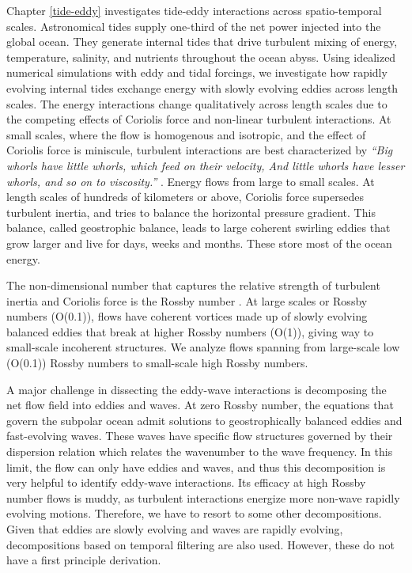 \documentclass[../Rajarshi-thesis-draft.tex]{subfiles}
\begin{document}

Chapter \ref{tide-eddy} investigates tide-eddy interactions across spatio-temporal scales. Astronomical tides supply one-third of the net power injected into the global ocean. They generate internal tides that drive turbulent mixing of energy, temperature, salinity, and nutrients throughout the ocean abyss. Using idealized numerical simulations with eddy and tidal forcings, we investigate how rapidly evolving internal tides exchange energy with slowly evolving eddies across length scales. The energy interactions change qualitatively across length scales due to the competing effects of Coriolis force and non-linear turbulent interactions. At small scales, where the flow is homogenous and isotropic, and the effect of Coriolis force is miniscule, turbulent interactions are best characterized by \emph{``Big whorls have little whorls, which feed on their velocity, And little whorls have lesser whorls, and so on to viscosity.''} \cite{richardson2007}. Energy flows from large to small scales. At length scales of hundreds of kilometers or above, Coriolis force supersedes turbulent inertia, and tries to balance the horizontal pressure gradient. This balance, called geostrophic balance, leads to large coherent swirling eddies that grow larger and live for days, weeks and months. These store most of the ocean energy.

The non-dimensional number that captures the relative strength of turbulent inertia and Coriolis force is the Rossby number . At large scales or Rossby numbers (O(0.1)), flows have coherent vortices made up of slowly evolving balanced eddies that break at higher Rossby numbers (O(1)), giving way to small-scale incoherent structures. We analyze flows spanning from large-scale low (O(0.1)) Rossby numbers to small-scale high Rossby numbers.

A major challenge in dissecting the eddy-wave interactions is decomposing the net flow field into eddies and waves. At zero Rossby number, the equations that govern the subpolar ocean admit solutions to geostrophically balanced eddies and fast-evolving waves. These waves have specific flow structures governed by their dispersion relation which relates the wavenumber to the wave frequency. In this limit, the flow can only have eddies and waves, and thus this decomposition is very helpful to identify eddy-wave interactions. Its efficacy at high Rossby number flows is muddy, as turbulent interactions energize more non-wave rapidly evolving motions. Therefore, we have to resort to some other decompositions. Given that eddies are slowly evolving and waves are rapidly evolving, decompositions based on temporal filtering are also used. However, these do not have a first principle derivation.
\end{document}
